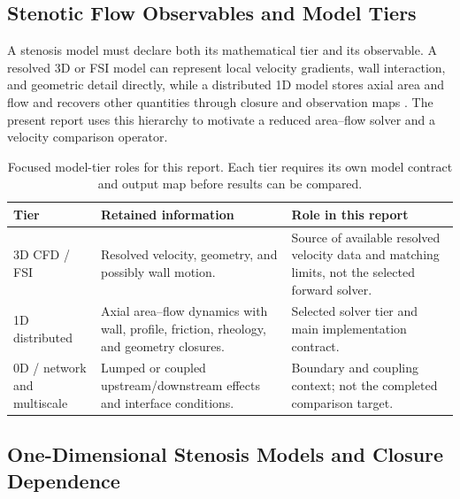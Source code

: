 \subsection{Stenotic Flow Observables and Model Tiers}
\label{subsec:stenotic-hemodynamics-observables}

A stenosis model must declare both its mathematical tier and its observable. A
resolved 3D or FSI model can represent local velocity gradients, wall interaction,
and geometric detail directly, while a distributed 1D model stores axial area and
flow and recovers other quantities through closure and observation maps
\cite{FormaggiaEtAl2007FSICoupling,QuarteroniVeneziani2003GeometricalMultiscale,KopplHelmig2023DimensionReducedModeling}. The present report uses this hierarchy
to motivate a reduced area--flow solver and a velocity comparison operator.

\begin{table}[!htb]
    \centering
    \scriptsize
    \caption{Focused model-tier roles for this report. Each tier requires its own
    model contract and output map before results can be compared.}
    \label{tab:model-tier-review}
    \begin{tabularx}{\textwidth}{@{}
        >{\raggedright\arraybackslash}p{}
        >{\raggedright\arraybackslash}p{}
        >{\raggedright\arraybackslash}X@{}}
        \toprule
        \textbf{Tier} & \textbf{Retained information} & \textbf{Role in this report} \\
        \midrule
        3D CFD / FSI
            & Resolved velocity, geometry, and possibly wall motion.
            & Source of available resolved velocity data and matching limits, not the
            selected forward solver. \\
        1D distributed
            & Axial area--flow dynamics with wall, profile, friction, rheology, and
            geometry closures.
            & Selected solver tier and main implementation contract. \\
        0D / network and multiscale
            & Lumped or coupled upstream/downstream effects and interface conditions.
            & Boundary and coupling context; not the completed comparison target. \\
        \bottomrule
    \end{tabularx}
\end{table}

\subsection{One-Dimensional Stenosis Models and Closure Dependence}
\label{subsec:model-hierarchy-literature}
\label{subsec:literature-1d-stenotic-vessels}

